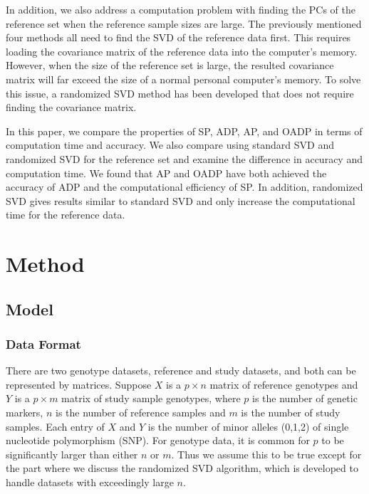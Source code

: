 \documentclass{article}
\begin{document}
In addition, we also address a computation problem with finding the PCs of the reference set when the reference sample sizes are large. 
The previously mentioned four methods all need to find the SVD of the reference data first.
This requires loading the covariance matrix of the reference data into the
computer's memory. 
However, when the size of the reference set is large,
the resulted covariance matrix will far exceed the size of a normal personal
computer's memory.
To solve this issue, a randomized SVD method has been developed that does not
require finding the covariance matrix.

In this paper, we compare the properties of
SP, ADP, AP, and OADP in terms of computation time and accuracy.
We also compare using standard SVD and randomized SVD for the reference set
and examine the difference in accuracy and computation time.
We found that AP and OADP have both achieved the accuracy of ADP
and the computational efficiency of SP.
In addition, randomized SVD gives results similar to standard SVD and only increase the computational time for the reference data.




\section{Method}

\subsection{Model}

\subsubsection{Data Format}
There are two genotype datasets, reference and study datasets, and both can be represented by matrices.
Suppose $X$ is a $p \times n$ matrix of reference genotypes and 
$Y$ is a $p \times m$ matrix of study sample genotypes, where 
$p$ is the number of genetic markers, $n$ is the number of reference samples and $m$ is the number of study samples. Each entry of $X$ and $Y$ is the number of minor alleles (0,1,2) of single nucleotide polymorphism (SNP). 
For genotype data, it is common for $p$ to be significantly larger than either $n$ or $m$.
Thus we assume this to be true except for the part where we discuss the randomized SVD algorithm,
which is developed to handle datasets with exceedingly large $n$.
\end{document}
